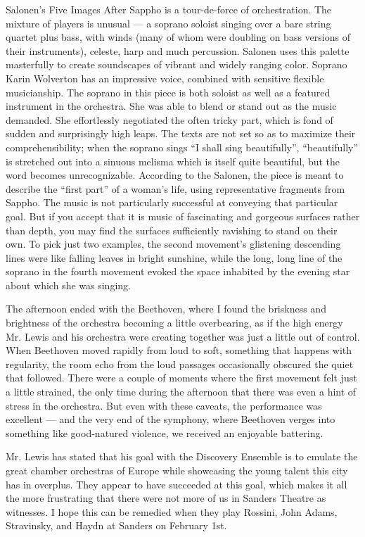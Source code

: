 Salonen’s Five Images After Sappho is a tour-de-force of orchestration. The mixture of players is unusual — a soprano soloist singing over a bare string quartet plus bass, with winds (many of whom were doubling on bass versions of their instruments), celeste, harp and much percussion. Salonen uses this palette masterfully to create soundscapes of vibrant and widely ranging color. Soprano Karin Wolverton has an impressive voice, combined with sensitive flexible musicianship. The soprano in this piece is both soloist as well as a featured instrument in the orchestra. She was able to blend or stand out as the music demanded. She effortlessly negotiated the often tricky part, which is fond of sudden and surprisingly high leaps. The texts are not set so as to maximize their comprehensibility; when the soprano sings “I shall sing beautifully”, “beautifully” is stretched out into a sinuous melisma which is itself quite beautiful, but the word becomes unrecognizable. According to the Salonen, the piece is meant to describe the “first part” of a woman’s life, using representative fragments from Sappho. The music is not particularly successful at conveying that particular goal. But if you accept that it is music of fascinating and gorgeous surfaces rather than depth, you may find the surfaces sufficiently ravishing to stand on their own. To pick just two examples, the second movement’s glistening descending lines were like falling leaves in bright sunshine, while the long, long line of the soprano in the fourth movement evoked the space inhabited by the evening star about which she was singing.

The afternoon ended with the Beethoven, where I found the briskness and brightness of the orchestra becoming a little overbearing, as if the high energy Mr. Lewis and his orchestra were creating together was just a little out of control. When Beethoven moved rapidly from loud to soft, something that happens with regularity, the room echo from the loud passages occasionally obscured the quiet that followed. There were a couple of moments where the first movement felt just a little strained, the only time during the afternoon that there was even a hint of stress in the orchestra. But even with these caveats, the performance was excellent — and the very end of the symphony, where Beethoven verges into something like good-natured violence, we received an enjoyable battering.

Mr. Lewis has stated that his goal with the Discovery Ensemble is to emulate the great chamber orchestras of Europe while showcasing the young talent this city has in overplus. They appear to have succeeded at this goal, which makes it all the more frustrating that there were not more of us in Sanders Theatre as witnesses. I hope this can be remedied when they play Rossini, John Adams, Stravinsky, and Haydn at Sanders on February 1st.
